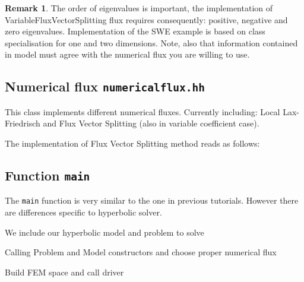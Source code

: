 \documentclass[a4paper,12pt]{article}
\theoremstyle{definition}
\theoremstyle{definition}
\newtheorem{Rem}[Def]{Remark}
\begin{document}


\begin{Rem}
	The order of eigenvalues is important, the implementation of VariableFluxVectorSplitting flux requires consequently: positive, negative and zero eigenvalues. Implementation of the SWE example is based on class specialisation for one and two dimensions. Note, also that information contained in model must agree with the numerical flux you are willing to use.
\end{Rem}

\subsection{Numerical flux \lstinline{numericalflux.hh}}

This class implements different numerical fluxes. Currently including: Local Lax-Friedrisch and  Flux Vector Splitting (also in variable coefficient case).

The implementation of Flux Vector Splitting method reads as follows:



\subsection{Function \lstinline{main}}

The \lstinline{main} function is very similar to the one in previous tutorials. However there are differences specific to hyperbolic solver.

We include our hyperbolic model and problem to solve



Calling Problem and Model constructors and choose proper numerical flux




Build FEM space and call driver

\end{document}
